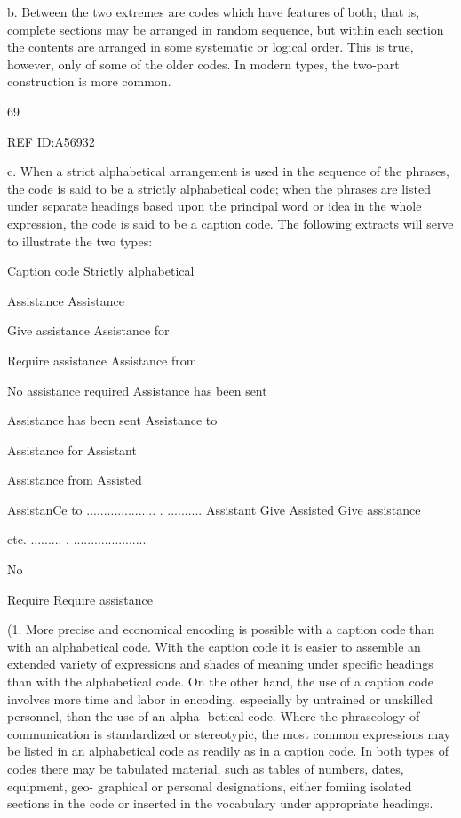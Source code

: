  

 

 

 

 

 

b. Between the two extremes are codes which have features of both;
that is, complete sections may be arranged in random sequence, but
within each section the contents are arranged in some systematic or
logical order. This is true, however, only of some of the older codes. In
modern types, the two-part construction is more common.

69

 

 

 

 

REF ID:A56932

c. When a strict alphabetical arrangement is used in the sequence of
the phrases, the code is said to be a strictly alphabetical code; when the
phrases are listed under separate headings based upon the principal word
or idea in the whole expression, the code is said to be a caption code. The
following extracts will serve to illustrate the two types:

Caption code Strictly alphabetical

Assistance Assistance

Give assistance Assistance for

Require assistance Assistance from

No assistance required Assistance has been sent

Assistance has been sent Assistance to

Assistance for Assistant

Assistance from Assisted

AssistanCe to .................... . ..........
Assistant Give
Assisted Give assistance

etc. ......... . .....................

No

Require
Require assistance

(1. More precise and economical encoding is possible with a caption
code than with an alphabetical code. With the caption code it is easier
to assemble an extended variety of expressions and shades of meaning
under speciﬁc headings than with the alphabetical code. On the other
hand, the use of a caption code involves more time and labor in encoding,
especially by untrained or unskilled personnel, than the use of an alpha-
betical code. Where the phraseology of communication is standardized or
stereotypic, the most common expressions may be listed in an alphabetical
code as readily as in a caption code. In both types of codes there may be
tabulated material, such as tables of numbers, dates, equipment, geo-
graphical or personal designations, either fomiing isolated sections in
the code or inserted in the vocabulary under appropriate headings.

